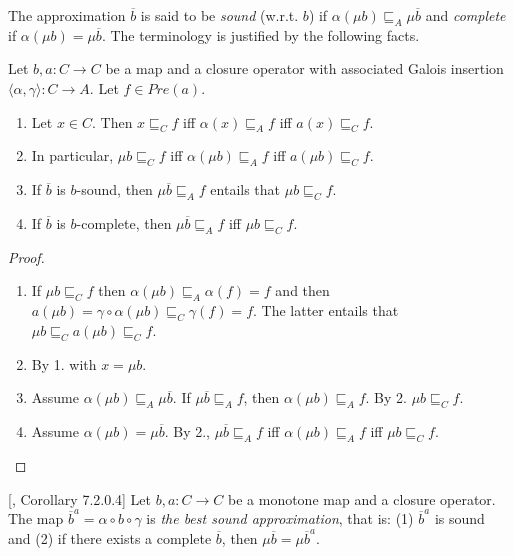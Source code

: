 \documentclass{llncs}
\begin{document}
The approximation $\overline{b}$ is said to be \emph{sound} (w.r.t. $b$) if
$\alpha(\mu b) \sqsubseteq_A \mu \overline{b}$ and \emph{complete} if
$\alpha(\mu b) = \mu \overline{b}$.
The terminology is justified by the following facts.
%
%
%
\begin{lemma}\label{lemma:absouncomplete}
Let $b,a\colon C \to C$ be a map and a closure operator with associated Galois insertion $\langle \alpha, \gamma \rangle \colon C \to A$. Let $f\in Pre(a)$.
\begin{enumerate}
\item Let $x\in C$. Then  $x \sqsubseteq_C f$ iff $\alpha(x) \sqsubseteq_A f$ iff $a(x) \sqsubseteq_C f$.
\item In particular, $\mu b \sqsubseteq_C f$ iff $\alpha(\mu b) \sqsubseteq_A f$ iff $a(\mu b) \sqsubseteq_C f$.
\item If $\overline{b}$ is $b$-sound, then $\mu \overline{b} \sqsubseteq_A f$ entails that $\mu b \sqsubseteq_C f$.
\item  If $\overline{b}$ is $b$-complete, then $\mu \overline{b} \sqsubseteq_A f$ iff $\mu b \sqsubseteq_C f$.
\end{enumerate} 
\end{lemma}
%
\begin{proof}
\begin{enumerate}
\item If $\mu b \sqsubseteq_C f$ then $\alpha(\mu b) \sqsubseteq_A \alpha(f) = f$ and then $a (\mu b) = \gamma\circ \alpha(\mu b) \sqsubseteq_C \gamma(f) = f$. The latter entails that $\mu b \sqsubseteq_C a(\mu b) \sqsubseteq_C f$.
\item By 1. with $x=\mu b$.
\item Assume $\alpha(\mu b) \sqsubseteq_A \mu \overline{b}$. If $\mu \overline{b} \sqsubseteq_A f$, then $\alpha(\mu b)  \sqsubseteq_A f$. By 2. $\mu b \sqsubseteq_C f$.
\item  Assume $\alpha(\mu b) = \mu \overline{b}$. By 2., $\mu \overline{b} \sqsubseteq_A f$ iff $\alpha(\mu b)  \sqsubseteq_A f$ iff $\mu b \sqsubseteq_C f$.
\end{enumerate}
\end{proof}

\begin{proposition}\label{prop:alwayssound}[\cite{cousot1979systematic}, Corollary 7.2.0.4]
Let $b,a\colon C \to C$ be a monotone map and a closure operator.
The map $\overline{b}^a = \alpha \circ b \circ \gamma $ is \emph{the best sound approximation}, that is: (1) $\overline{b}^a$ is sound and (2) if there exists a complete $\overline{b}$, then $\mu \overline{b} = \mu \overline{b}^a$.
\end{proposition}
\end{document}
